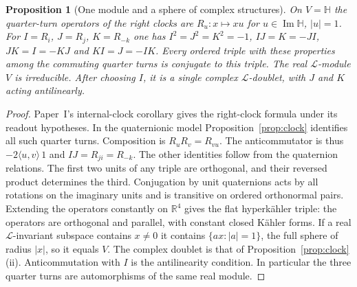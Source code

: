 \documentclass[aps,pra,onecolumn,superscriptaddress,nofootinbib,10pt]{revtex4-2}
\newtheorem{proposition}[theorem]{Proposition}
\theoremstyle{definition}
\theoremstyle{remark}
\begin{document}
\begin{proposition}[One module and a sphere of complex structures]\label{gn:clocks}
On $V=\mathbb H$ the quarter-turn operators of the right clocks are
$R_u:x\mapsto xu$ for $u\in\operatorname{Im}\mathbb H$, $|u|=1$. For
$I=R_i$, $J=R_j$, $K=R_{-k}$ one has
$I^2=J^2=K^2=-1$, $IJ=K=-JI$, $JK=I=-KJ$ and $KI=J=-IK$.
Every ordered triple with these properties among the commuting
quarter turns is conjugate to this triple. The real $\mathcal L$-module
$V$ is irreducible. After choosing $I$, it is a single complex
$\mathcal L$-doublet, with $J$ and $K$ acting antilinearly.
\end{proposition}
\begin{proof}
Paper~I's internal-clock corollary \cite[Cor.~5C.22]{PaperI} gives
the right-clock formula under its readout hypotheses. In the quaternionic
model Proposition~\ref{prop:clock} identifies all such quarter turns.
Composition is $R_uR_v=R_{vu}$. The anticommutator is thus
$-2\langle u,v\rangle\,1$ and $IJ=R_{ji}=R_{-k}$. The other identities
follow from the quaternion relations. The first two units of any triple
are orthogonal, and their reversed product determines the third.
Conjugation by unit quaternions acts by all rotations on the imaginary
units and is transitive on ordered orthonormal pairs. Extending the
operators constantly on $\mathbb R^4$ gives the flat hyperk\"ahler triple:
the operators are orthogonal and parallel, with constant closed K\"ahler
forms. If a real $\mathcal L$-invariant subspace contains $x\ne0$ it
contains $\{ax:|a|=1\}$, the full sphere of radius $|x|$, so it equals
$V$. The complex doublet is that of Proposition~\ref{prop:clock}(ii).
Anticommutation with $I$ is the antilinearity condition. In particular
the three quarter turns are automorphisms of the same real module.
\end{proof}
\end{document}

